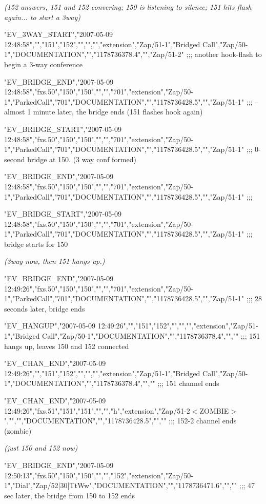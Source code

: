 \begin{astlisting}
{\it (152 answers, 151 and 152 convering; 150 is listening to silence; 151 hits flash again... to start a 3way)}

"EV\_3WAY\_START","2007-05-09 12:48:58","","151","152","","","","extension","Zap/51-1","Bridged Call","Zap/50-1","DOCUMENTATION","","1178736378.4","","Zap/51-2"           ;;; another hook-flash to begin a 3-way conference

"EV\_BRIDGE\_END","2007-05-09 12:48:58","fxs.50","150","150","","","701","extension","Zap/50-1","ParkedCall","701","DOCUMENTATION","","1178736428.5","","Zap/51-1"         ;;; -- almost 1 minute later, the bridge ends (151 flashes hook again)

"EV\_BRIDGE\_START","2007-05-09 12:48:58","fxs.50","150","150","","","701","extension","Zap/50-1","ParkedCall","701","DOCUMENTATION","","1178736428.5","","Zap/51-1"       ;;; 0-second bridge at 150. (3 way conf formed)

"EV\_BRIDGE\_END","2007-05-09 12:48:58","fxs.50","150","150","","","701","extension","Zap/50-1","ParkedCall","701","DOCUMENTATION","","1178736428.5","","Zap/51-1"         ;;;

"EV\_BRIDGE\_START","2007-05-09 12:48:58","fxs.50","150","150","","","701","extension","Zap/50-1","ParkedCall","701","DOCUMENTATION","","1178736428.5","","Zap/51-1"       ;;; bridge starts for 150

{\it (3way now, then 151 hangs up.)}

"EV\_BRIDGE\_END","2007-05-09 12:49:26","fxs.50","150","150","","","701","extension","Zap/50-1","ParkedCall","701","DOCUMENTATION","","1178736428.5","","Zap/51-1"         ;;; 28 seconds later, bridge ends

"EV\_HANGUP","2007-05-09 12:49:26","","151","152","","","","extension","Zap/51-1","Bridged Call","Zap/50-1","DOCUMENTATION","","1178736378.4","",""                       ;;; 151 hangs up, leaves 150 and 152 connected

"EV\_CHAN\_END","2007-05-09 12:49:26","","151","152","","","","extension","Zap/51-1","Bridged Call","Zap/50-1","DOCUMENTATION","","1178736378.4","",""                     ;;; 151 channel ends

"EV\_CHAN\_END","2007-05-09 12:49:26","fxs.51","151","151","","","h","extension","Zap/51-2$<$ZOMBIE$>$","","","DOCUMENTATION","","1178736428.5","",""                          ;;; 152-2 channel ends (zombie)

{\it (just 150 and 152 now)}

"EV\_BRIDGE\_END","2007-05-09 12:50:13","fxs.50","150","150","","","152","extension","Zap/50-1","Dial","Zap/52|30|TtWw","DOCUMENTATION","","1178736471.6","",""            ;;; 47 sec later, the bridge from 150 to 152 ends


\end{astlisting}
